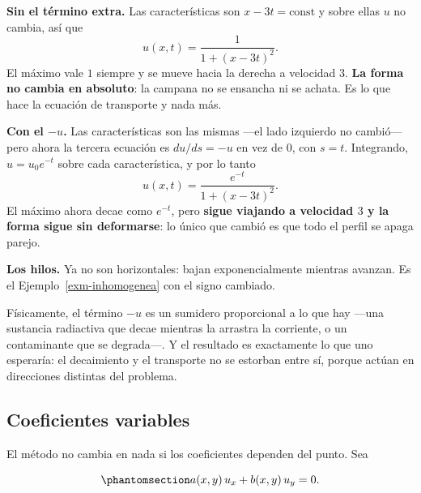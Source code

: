\documentclass[
  spanish,
  a4paper,
]{scrbook}
\theoremstyle{definition}
\theoremstyle{plain}
\theoremstyle{definition}
\theoremstyle{plain}
\theoremstyle{definition}
\theoremstyle{remark}
\begin{document}
\begin{tcolorbox}[enhanced jigsaw, arc=.35mm, bottomrule=.15mm, bottomtitle=1mm, breakable, colback=white, colbacktitle=quarto-callout-tip-color!10!white, colframe=quarto-callout-tip-color-frame, coltitle=black, left=2mm, leftrule=.75mm, opacityback=0, opacitybacktitle=0.6, rightrule=.15mm, title=\textcolor{quarto-callout-tip-color}{\faLightbulb}\hspace{0.5em}{Solución}, titlerule=0mm, toprule=.15mm, toptitle=1mm]

\textbf{Sin el término extra.} Las características son
\(x - 3t = \text{const}\) y sobre ellas \(u\) no cambia, así que
\[u(x,t) = \frac{1}{1 + (x-3t)^2}.\] El máximo vale \(1\) siempre y se
mueve hacia la derecha a velocidad \(3\). \textbf{La forma no cambia en
absoluto}: la campana no se ensancha ni se achata. Es lo que hace la
ecuación de transporte y nada más.

\textbf{Con el \(-u\).} Las características son las mismas ---el lado
izquierdo no cambió--- pero ahora la tercera ecuación es \(du/ds = -u\)
en vez de \(0\), con \(s = t\). Integrando, \(u = u_0 e^{-t}\) sobre
cada característica, y por lo tanto
\[u(x,t) = \frac{e^{-t}}{1 + (x-3t)^2}.\] El máximo ahora decae como
\(e^{-t}\), pero \textbf{sigue viajando a velocidad \(3\) y la forma
sigue sin deformarse}: lo único que cambió es que todo el perfil se
apaga parejo.

\textbf{Los hilos.} Ya no son horizontales: bajan exponencialmente
mientras avanzan. Es el Ejemplo~\ref{exm-inhomogenea} con el signo
cambiado.

Físicamente, el término \(-u\) es un sumidero proporcional a lo que hay
---una sustancia radiactiva que decae mientras la arrastra la corriente,
o un contaminante que se degrada---. Y el resultado es exactamente lo
que uno esperaría: el decaimiento y el transporte no se estorban entre
sí, porque actúan en direcciones distintas del problema.

\end{tcolorbox}

\subsection{Coeficientes variables}\label{sec-coef-variables}

El método no cambia en nada si los coeficientes dependen del punto. Sea

\begin{equation}\protect\phantomsection\label{eq-lineal-homogenea-1}{
a(x,y)\,u_x + b(x,y)\,u_y = 0 .
}\end{equation}
\end{document}
